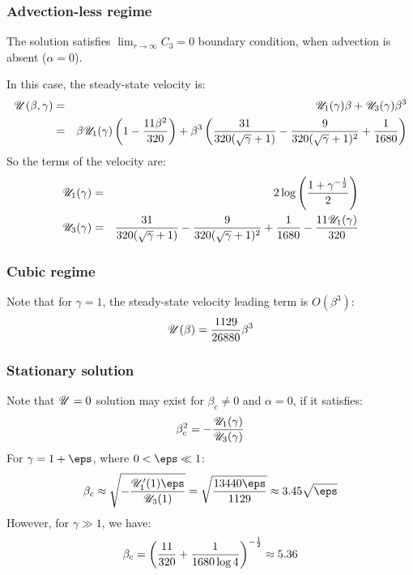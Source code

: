 \subsubsection{Advection-less regime}
The solution satisfies $\lim_{r\rightarrow\infty}C_3 = 0$ boundary condition, 
when advection is absent ($\alpha = 0$).

In this case, the steady-state velocity is:
\begin{eqnarray}
\mathscr{U}(\beta, \gamma) &=& \mathscr{U}_1(\gamma) \beta + \mathscr{U}_3(\gamma) \beta^3 \\ &=&
\beta \mathscr{U}_1(\gamma) \left(1 - \frac{11\beta^2}{320}\right) + 
\beta^3 \left(\frac{31}{320(\sqrt\gamma + 1)} - \frac{9}{320(\sqrt\gamma + 1)^2} + \frac{1}{1680}\right)
\end{eqnarray}
So the terms of the velocity are:
\begin{eqnarray}
\mathscr{U}_1(\gamma) &=& 2 \log \left(\frac{1 + \gamma^{-\frac{1}{2}}}{2}\right) \\
\mathscr{U}_3(\gamma) &=& \frac{31}{320(\sqrt\gamma + 1)} - \frac{9}{320(\sqrt\gamma + 1)^2} + \frac{1}{1680} - \frac{11 \mathscr{U}_1(\gamma)}{320}
\end{eqnarray}

\subsubsection{Cubic regime}
Note that for $\gamma = 1$, the steady-state velocity leading term is $O(\beta^3)$:
\begin{eqnarray}
\mathscr{U}(\beta) = \frac{1129}{26880}\beta^3
\end{eqnarray}

\subsubsection{Stationary solution}
Note that $\mathscr{U} = 0$ solution may exist for $\beta_c \ne 0$ and $\alpha = 0$, 
if it satisfies:
\begin{eqnarray}
\beta_c^2 = -\frac{\mathscr{U}_1(\gamma)}{\mathscr{U}_3(\gamma)}
\end{eqnarray}
For $\gamma = 1 + \eps$, where $0 < \eps \ll 1$:
\begin{eqnarray}
\beta_c \approx \sqrt{-\frac{\cU_1'(1) \eps}{\cU_3(1)}} = 
 \sqrt{\frac{13440 \eps}{1129}} \approx 3.45 \sqrt{\eps}
\end{eqnarray}
However, for $\gamma \gg 1$, we have:
\begin{eqnarray}
\beta_c =  \left(\frac{11}{320} + \frac{1}{1680 \log 4}\right)^{-\frac{1}{2}} \approx 5.36
\end{eqnarray}